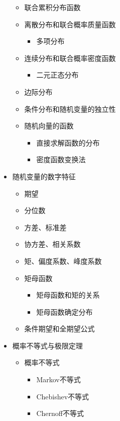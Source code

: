 \documentclass{article}
\begin{document}
\begin{CJK}{UTF8}{gbsn}
\begin{itemize}
\begin{itemize}
        \item 联合累积分布函数
        \item 离散分布和联合概率质量函数
        \begin{itemize}
            \item 多项分布
        \end{itemize}
        \item 连续分布和联合概率密度函数
        \begin{itemize}
            \item 二元正态分布
        \end{itemize}
        \item 边际分布
        \item 条件分布和随机变量的独立性
        \item 随机向量的函数
        \begin{itemize}
            \item 直接求解函数的分布
            \item 密度函数变换法
        \end{itemize}
    \end{itemize}
    \item 随机变量的数字特征
    \begin{itemize}
        \item 期望
        \item 分位数
        \item 方差、标准差
        \item 协方差、相关系数
        \item 矩、偏度系数、峰度系数
        \item 矩母函数
        \begin{itemize}
            \item 矩母函数和矩的关系
            \item 矩母函数确定分布
        \end{itemize}
        \item 条件期望和全期望公式
    \end{itemize}
    \item 概率不等式与极限定理
    \begin{itemize}
        \item 概率不等式
        \begin{itemize}
            \item Markov不等式
            \item Chebishev不等式
            \item Chernoff不等式
        \end{itemize}

\end{itemize}
\end{itemize}
\end{CJK}
\end{document}

